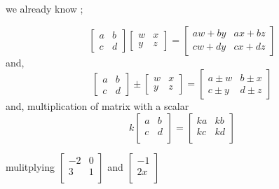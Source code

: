 \documentclass[journal,12pt,twocolumn]{IEEEtran}
\theoremstyle{remark}
\numberwithin{equation}{subsection}
\begin{document}
  we already know ;
    
    \begin{equation}
       \begin{bmatrix}
        a & b \\
        c & d
      \end{bmatrix}
      \begin{bmatrix}
        w & x \\
        y & z
      \end{bmatrix}
      =
      \begin{bmatrix}
        aw+by & ax+bz \\
        cw+dy & cx+dz
      \end{bmatrix}
    \end{equation}
    and,
    \begin{equation}
      \begin{bmatrix}
        a & b \\
        c & d
      \end{bmatrix}
      \pm
      \begin{bmatrix}
        w & x \\
        y & z
      \end{bmatrix}
      =
      \begin{bmatrix}
        a\pm w & b\pm x \\
        c\pm y & d\pm z
      \end{bmatrix}
    \end{equation}
    and,
    multiplication of matrix with a scalar
    \begin{equation}
     k\begin{bmatrix}
        a & b  \\
        c & d  \\
      \end{bmatrix}
      =
      \begin{bmatrix}
       ka & kb  \\
       kc & kd  \\
      \end{bmatrix}
    \end{equation}
    
   mulitplying $\begin{bmatrix}
        -2 & 0 \\
        3 & 1 \\
      \end{bmatrix}$
      and 
      $\begin{bmatrix}
        -1 \\
        2x \\
      \end{bmatrix}$
      
\end{document}
